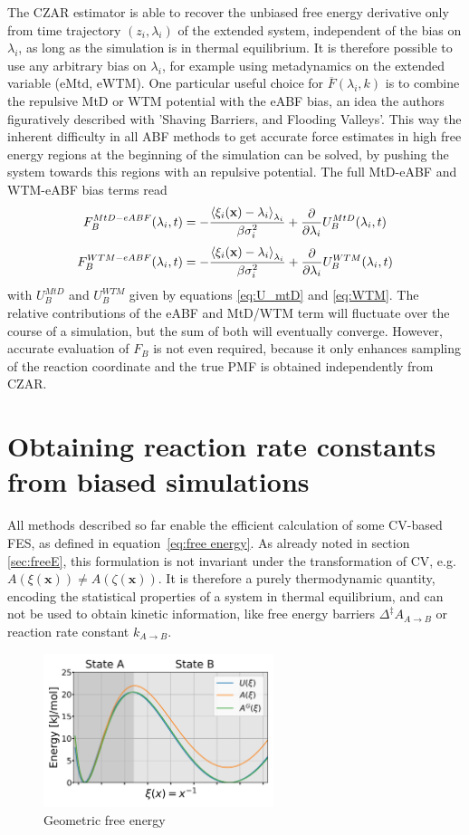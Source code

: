 The CZAR estimator is able to recover the unbiased free energy derivative only from time trajectory $(z_i,\lambda_i)$ of the extended system, independent of the bias on $\lambda_i$, as long as the simulation is in thermal equilibrium. It is therefore possible to use any arbitrary bias on $\lambda_i$, for example using metadynamics on the extended variable (eMtd, eWTM).
One particular useful choice for $\overline{F}(\lambda_{i}, k)$ is to combine the repulsive MtD or WTM potential with the eABF bias, an idea the authors figuratively described with 'Shaving Barriers, and Flooding Valleys'.\autocite{fu2018zooming}
This way the inherent difficulty in all ABF methods to get accurate force estimates in high free energy regions at the beginning of the simulation can be solved, by pushing the system towards this regions with an repulsive potential.
The full MtD-eABF and WTM-eABF bias terms read
\begin{equation}
  F_{B}^{MtD-eABF}(\lambda_i, t) = -\frac{\braket{\xi_i(\textbf{x})-\lambda_i}_{\lambda_i}}{\beta \sigma_i^2}+\frac{\partial}{\partial \lambda_i} U_{B}^{MtD}(\lambda_i,t)
\end{equation}
\begin{equation}
  F_{B}^{WTM-eABF}(\lambda_i, t) = -\frac{\braket{\xi_i(\textbf{x})-\lambda_i}_{\lambda_i}}{\beta \sigma_i^2}+\frac{\partial}{\partial \lambda_i} U_{B}^{WTM}(\lambda_i,t)
\end{equation}
with $U_{B}^{MtD}$ and $U_{B}^{WTM}$ given by equations \ref{eq:U_mtD} and \ref{eq:WTM}.
The relative contributions of the eABF and MtD/WTM term will fluctuate over the course of a simulation, but the sum of both will eventually converge. However, accurate evaluation of $F_B$ is not even required, because it only enhances sampling of the reaction coordinate and the true PMF is obtained independently from CZAR.

\section{Obtaining reaction rate constants from biased simulations}
\label{sec:A_geom}
All methods described so far enable the efficient calculation of some CV-based FES, as defined in equation~\ref{eq:free energy}. As already noted in section \ref{sec:freeE}, this formulation is not invariant under the transformation of CV, e.g. $A(\xi(\textbf{x}))\neq A(\zeta(\textbf{x}))$. It is therefore a purely thermodynamic quantity, encoding the statistical properties of a system in thermal equilibrium, and can not be used to obtain kinetic information, like free energy barriers $\Delta^\ddagger A_{A\rightarrow B}$ or reaction rate constant $k_{A\rightarrow B}$.\autocite{bal2020free}

\begin{figure}[H]
    \centering
    \includegraphics[width=0.6\textwidth]{bilder/geom_free_energy}
    \caption{Geometric free energy}
\label{fig:FEM}%
\end{figure}

